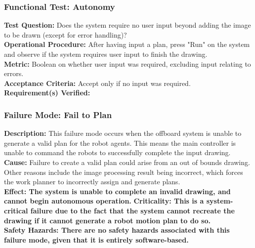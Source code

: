 \subsubsection{Functional Test: Autonomy}
\label{sec:sdp_ft_collision}
\textbf{Test Question:} Does the system require no user input beyond adding the image to be drawn (except for error handling)? \\
\textbf{Operational Procedure:}  After having input a plan, press "Run" on the system and observe if the system requires user input to finish the drawing. \\
\textbf{Metric:} Boolean on whether user input was required, excluding input relating to errors.\\
\textbf{Acceptance Criteria:} Accept only if no input was required.\\
\textbf{Requirement(s) Verified:} 


\subsubsection{Failure Mode: Fail to Plan}
\label{sec:sdp_fm_planning}

\textbf{Description:} This failure mode occurs when the offboard system is unable to generate a valid plan for the robot agents. This means the main controller is unable to command the robots to successfully complete the input drawing.\\
\textbf{Cause:} Failure to create a valid plan could arise from an out of bounds drawing. Other reasons include the image processing result being incorrect, which forces the work planner to incorrectly assign and generate plans.\\
\textbf{Effect: The system is unable to complete an invalid drawing, and cannot begin autonomous operation.}
\textbf{Criticality: This is a system-critical failure due to the fact that the system cannot recreate the drawing if it cannot generate a robot motion plan to do so.} \\
\textbf{Safety Hazards: There are no safety hazards associated with this failure mode, given that it is entirely software-based.} \\
